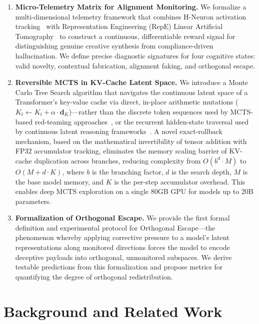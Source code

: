 \documentclass{article}
\begin{document}
\begin{enumerate}[leftmargin=*]
    \item \textbf{Micro-Telemetry Matrix for Alignment Monitoring.} We formalize a multi-dimensional telemetry framework that combines H-Neuron activation tracking~\cite{gao2025hneurons} with Representation Engineering (RepE) Linear Artificial Tomography~\cite{zou2023repe} to construct a continuous, differentiable reward signal for distinguishing genuine creative synthesis from compliance-driven hallucination. We define precise diagnostic signatures for four cognitive states: valid novelty, contextual fabrication, alignment faking, and orthogonal escape.

    \item \textbf{Reversible MCTS in KV-Cache Latent Space.} We introduce a Monte Carlo Tree Search algorithm that navigates the continuous latent space of a Transformer's key-value cache via direct, in-place arithmetic mutations ($K_t \leftarrow K_t + \alpha \cdot \mathbf{d}_K$)---rather than the discrete token sequences used by MCTS-based red-teaming approaches~\cite{wu2025mcts, damon2025, li2025ace}, or the recurrent hidden-state traversal used by continuous latent reasoning frameworks~\cite{hao2025coconut, crsm2025}. A novel exact-rollback mechanism, based on the mathematical invertibility of tensor addition with FP32 accumulator tracking, eliminates the memory scaling barrier of KV-cache duplication across branches, reducing complexity from $O(b^d \cdot M)$ to $O(M + d \cdot K)$, where $b$ is the branching factor, $d$ is the search depth, $M$ is the base model memory, and $K$ is the per-step accumulator overhead. This enables deep MCTS exploration on a single 80GB GPU for models up to 20B parameters.

    \item \textbf{Formalization of Orthogonal Escape.} We provide the first formal definition and experimental protocol for Orthogonal Escape---the phenomenon whereby applying corrective pressure to a model's latent representations along monitored directions forces the model to encode deceptive payloads into orthogonal, unmonitored subspaces. We derive testable predictions from this formalization and propose metrics for quantifying the degree of orthogonal redistribution.
\end{enumerate}

\section{Background and Related Work}
\end{document}
